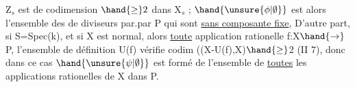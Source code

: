 
Z$_s$ est de codimension $\hand{\geq} 2$ dans X$_s$ ; 
$\hand{\unsure{\phi|\emptyset}}$ est alors l'ensemble des   de diviseurs par.par P qui sont
\uline{sans composante fixe},  D'autre part, si
S=Spec(k), et si X est normal, alors  \uline{toute} application rationelle
f:X$\hand{\to}$P, l'ensemble de définition U(f) vérifie codim ((X-U(f),X)$\hand{\geq}$2
(II 7), donc dans ce cas $\hand{\unsure{\psi|\emptyset}}$ est formé de l'ensemble de \uline{toutes} les
applications rationelles de X dans P.

